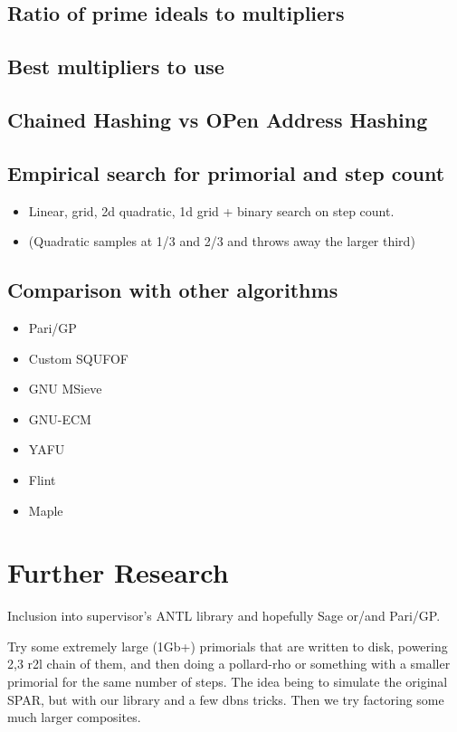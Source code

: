 \documentclass{ucalgthes1}
\theoremstyle{definition}
\begin{document}
\section{Ratio of prime ideals to multipliers}

\section{Best multipliers to use}

\section{Chained Hashing vs OPen Address Hashing}

\section{Empirical search for primorial and step count}
\begin{itemize}
\item Linear, grid, 2d quadratic, 1d grid + binary search on step count.
\item (Quadratic samples at 1/3 and 2/3 and throws away the larger third)
\end{itemize}

\section{Comparison with other algorithms}
\begin{itemize}
\item Pari/GP
\item Custom SQUFOF
\item GNU MSieve
\item GNU-ECM
\item YAFU
\item Flint
\item Maple
\end{itemize}

\chapter{Further Research}

Inclusion into supervisor's ANTL library and hopefully Sage or/and Pari/GP.

Try some extremely large (1Gb+) primorials that are written to disk, powering 2,3 r2l chain of them, and then doing a pollard-rho or something with a smaller primorial for the same number of steps.  The idea being to simulate the original SPAR, but with our library and a few dbns tricks.  Then we try factoring some much larger composites.
\end{document}
